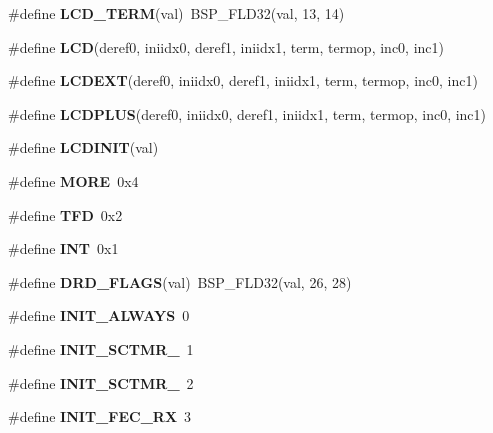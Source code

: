 \begin{DoxyCompactItemize}
\#define {\bfseries L\+C\+D\+\_\+\+T\+E\+RM}(val)~B\+S\+P\+\_\+\+F\+L\+D32(val, 13, 14)
\item 
\#define {\bfseries L\+CD}(deref0,  iniidx0,  deref1,  iniidx1,  term,  termop,  inc0,  inc1)
\item 
\#define {\bfseries L\+C\+D\+E\+XT}(deref0,  iniidx0,  deref1,  iniidx1,  term,  termop,  inc0,  inc1)
\item 
\#define {\bfseries L\+C\+D\+P\+L\+US}(deref0,  iniidx0,  deref1,  iniidx1,  term,  termop,  inc0,  inc1)
\item 
\#define {\bfseries L\+C\+D\+I\+N\+IT}(val)
\item 
\mbox{\label{group__BestCommOps_gaf1419a0ecedb20ed14a20e89ba0aae19}} 
\#define {\bfseries M\+O\+RE}~0x4
\item 
\mbox{\label{group__BestCommOps_gaab0b3c7eb5c79378bc03bf8506ea96f1}} 
\#define {\bfseries T\+FD}~0x2
\item 
\mbox{\label{group__BestCommOps_gafeeffe52c8fd59db7c61cf8b02042dbf}} 
\#define {\bfseries I\+NT}~0x1
\item 
\mbox{\label{group__BestCommOps_ga356302d8a5f7fb83d88a433811263953}} 
\#define {\bfseries D\+R\+D\+\_\+\+F\+L\+A\+GS}(val)~B\+S\+P\+\_\+\+F\+L\+D32(val, 26, 28)
\item 
\mbox{\label{group__BestCommOps_ga6cca7ae3181aa888177c9d8656bb3a61}} 
\#define {\bfseries I\+N\+I\+T\+\_\+\+A\+L\+W\+A\+YS}~0
\item 
\mbox{\label{group__BestCommOps_ga0e2224ef176a38f3d7236414a3712cd6}} 
\#define {\bfseries I\+N\+I\+T\+\_\+\+S\+C\+T\+M\+R\+\_}~1
\item 
\mbox{\label{group__BestCommOps_gacf279ee05a176b55abc29159344a9fbd}} 
\#define {\bfseries I\+N\+I\+T\+\_\+\+S\+C\+T\+M\+R\+\_}~2
\item 
\mbox{\label{group__BestCommOps_ga6b68c4f934d855f6fb4d97a0e526af24}} 
\#define {\bfseries I\+N\+I\+T\+\_\+\+F\+E\+C\+\_\+\+RX}~3
\item 
\mbox{\label{group__BestCommOps_ga1ab7b1bbe06ea134e747cc72578880ee}} 

\end{DoxyCompactItemize}
